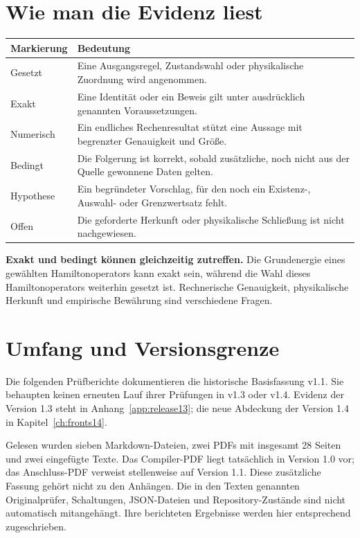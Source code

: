 \documentclass[11pt,a4paper,oneside,parskip=half,headings=normal]{scrreprt}
\begin{document}
\section*{Wie man die Evidenz liest}
\par\noindent\begin{tabularx}{\linewidth}{L{27mm}Y}
\toprule
\textbf{Markierung}&\textbf{Bedeutung}\\\midrule
Gesetzt&Eine Ausgangsregel, Zustandswahl oder physikalische Zuordnung wird angenommen.\\
Exakt&Eine Identität oder ein Beweis gilt unter ausdrücklich genannten Voraussetzungen.\\
Numerisch&Ein endliches Rechenresultat stützt eine Aussage mit begrenzter Genauigkeit und Größe.\\
Bedingt&Die Folgerung ist korrekt, sobald zusätzliche, noch nicht aus der Quelle gewonnene Daten gelten.\\
Hypothese&Ein begründeter Vorschlag, für den noch ein Existenz-, Auswahl- oder Grenzwertsatz fehlt.\\
Offen&Die geforderte Herkunft oder physikalische Schließung ist nicht nachgewiesen.\\\bottomrule
\end{tabularx}\par

\textbf{Exakt und bedingt können gleichzeitig zutreffen.} Die Grundenergie eines gewählten Hamiltonoperators kann exakt sein, während die Wahl dieses Hamiltonoperators weiterhin gesetzt ist. Rechnerische Genauigkeit, physikalische Herkunft und empirische Bewährung sind verschiedene Fragen.

\section*{Umfang und Versionsgrenze}
\begingroup\small
Die folgenden Prüfberichte dokumentieren die historische Basisfassung v1.1. Sie behaupten keinen erneuten Lauf ihrer Prüfungen in v1.3 oder v1.4. Evidenz der Version 1.3 steht in Anhang~\ref{app:release13}; die neue Abdeckung der Version 1.4 in Kapitel~\ref{ch:fronts14}.

Gelesen wurden sieben Markdown-Dateien, zwei PDFs mit insgesamt 28 Seiten und zwei eingefügte Texte. Das Compiler-PDF liegt tatsächlich in Version 1.0 vor; das Anschluss-PDF verweist stellenweise auf Version 1.1. Diese zusätzliche Fassung gehört nicht zu den Anhängen. Die in den Texten genannten Originalprüfer, Schaltungen, JSON-Dateien und Repository-Zustände sind nicht automatisch mitangehängt. Ihre berichteten Ergebnisse werden hier entsprechend zugeschrieben.
\end{document}
